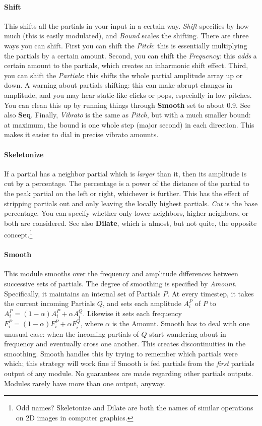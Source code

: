 \documentclass{article}
\begin{document}
\paragraph{Shift} This shifts all the partials in your input in a certain way.  {\it Shift} specifies by how much (this is easily modulated), and {\it Bound} scales the shifting.  There are three ways you can shift.  First you can shift the {\it Pitch}: this is essentially multiplying the partials by a certain amount.  Second, you can shift the {\it Frequency}: this {\it adds} a certain amount to the partials, which creates an inharmonic shift effect.  Third, you can shift the {\it Partials}: this shifts the whole partial amplitude array up or down.  A warning about partials shifting: this can make abrupt changes in amplitude, and you may hear static-like clicks or pops, especially in low pitches.  You can clean this up by running things through {\bf Smooth} set to about 0.9. See also {\bf Seq}.  Finally, {\it Vibrato} is the same as {\it Pitch}, but with a much smaller bound: at maximum, the bound is one whole step (major second) in each direction.  This makes it easier to dial in precise vibrato amounts.

\paragraph{Skeletonize} If a partial has a neighbor partial which is {\it larger} than it, then its amplitude is cut by a percentage.  The percentage is a power of the distance of the partial to the peak partial on the left or right, whichever is further.  This has the effect of stripping partials out and only leaving the locally highest partials.  {\it Cut} is the base percentage.  You can specify whether only lower neighbors, higher neighbors, or both are considered.  See also {\bf Dilate}, which is almost, but not quite, the opposite concept.\footnote{Odd names?  Skeletonize and Dilate are both the names of similar operations on 2D images in computer graphics.}

\paragraph{Smooth} This module smooths over the frequency and amplitude differences between successive sets of partials.  The degree of smoothing is specified by {\it Amount}.  Specifically, it maintains an internal set of Partials \(P\).  At every timestep, it takes the current incoming Partials \(Q\), and sets each amplitude \(A^P_i\) of \(P\) to \(A^P_i = (1-\alpha) A^P_i + \alpha A^Q_i\).  Likewise it sets each frequency \(F^P_i = (1-\alpha) F^P_i + \alpha F^Q_i\), where \(\alpha\) is the Amount.  Smooth has to deal with one unusual case: when the incoming partials of \(Q\) start wandering about in frequency and eventually cross one another.  This creates discontinuities in the smoothing.  Smooth handles this by trying to remember which partials were which; this strategy will work fine if Smooth is fed partials from the {\it first} partials output of any module.  No guarantees are made regarding other partials outputs.  Modules rarely have more than one output, anyway.
\end{document}
